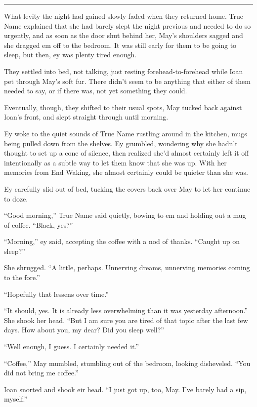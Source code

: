 \begin{center}\rule{0.5\linewidth}{0.5pt}\end{center}

What levity the night had gained slowly faded when they returned home. True Name explained that she had barely slept the night previous and needed to do so urgently, and as soon as the door shut behind her, May's shoulders sagged and she dragged em off to the bedroom. It was still early for them to be going to sleep, but then, ey was plenty tired enough.

They settled into bed, not talking, just resting forehead-to-forehead while Ioan pet through May's soft fur. There didn't seem to be anything that either of them needed to say, or if there was, not yet something they could.

Eventually, though, they shifted to their usual spots, May tucked back against Ioan's front, and slept straight through until morning.

Ey woke to the quiet sounds of True Name rustling around in the kitchen, mugs being pulled down from the shelves. Ey grumbled, wondering why she hadn't thought to set up a cone of silence, then realized she'd almost certainly left it off intentionally as a subtle way to let them know that she was up. With her memories from End Waking, she almost certainly could be quieter than she was.

Ey carefully slid out of bed, tucking the covers back over May to let her continue to doze.

``Good morning,'' True Name said quietly, bowing to em and holding out a mug of coffee. ``Black, yes?''

``Morning,'' ey said, accepting the coffee with a nod of thanks. ``Caught up on sleep?''

She shrugged. ``A little, perhaps. Unnerving dreams, unnerving memories coming to the fore.''

``Hopefully that lessens over time.''

``It should, yes. It is already less overwhelming than it was yesterday afternoon.'' She shook her head. ``But I am sure you are tired of that topic after the last few days. How about you, my dear? Did you sleep well?''

``Well enough, I guess. I certainly needed it.''

``Coffee,'' May mumbled, stumbling out of the bedroom, looking disheveled. ``You did not bring me coffee.''

Ioan snorted and shook eir head. ``I just got up, too, May. I've barely had a sip, myself.''

